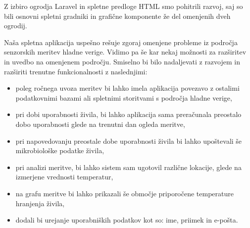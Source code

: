 \documentclass[a4paper, 12pt]{book}
\begin{document}
Z izbiro ogrodja Laravel in spletne predloge HTML smo pohitrili razvoj, saj so bili osnovni spletni gradniki in grafične komponente že del omenjenih dveh ogrodij.


Naša spletna aplikacija uspešno rešuje zgoraj omenjene probleme iz področja senzorskih meritev hladne verige. Vidimo pa še kar nekaj možnosti za razširitev in uvedbo na omenjenem področju. Smiselno bi bilo nadaljevati z razvojem in razširiti trenutne funkcionalnosti z naslednjimi:

\begin{itemize}
	\item poleg ročnega uvoza meritev bi lahko imela aplikacija povezavo z ostalimi podatkovnimi bazami ali spletnimi storitvami s področja hladne verige,

	\item pri dobi uporabnosti živila, bi lahko aplikacija sama preračunala preostalo dobo uporabnosti glede na trenutni dan ogleda meritve,

	\item pri napovedovanju preostale dobe uporabnosti živila bi lahko upoštevali še mikrobiološke podatke živila,

	\item pri analizi meritve, bi lahko sistem sam ugotovil različne lokacije, glede na izmerjene vrednosti temperatur,

	\item na grafu meritve bi lahko prikazali še območje priporočene temperature hranjenja živila,

	\item dodali bi urejanje uporabniških podatkov kot so: ime, priimek in e-pošta.
\end{itemize}



\ \\
\clearpage
{}


\end{document}
